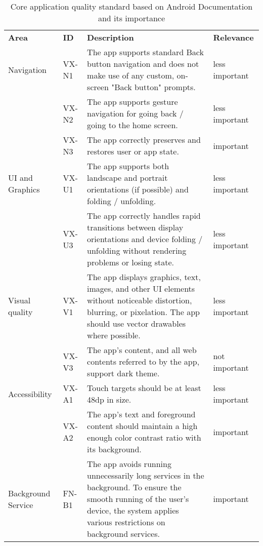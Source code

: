 
\begin{longtable}{p{} p{} p{} p{}}
    \label{tab:qualitystandard}\\

    \caption{Core application quality standard based on Android Documentation \autocite{androidqualityguidelines} and its importance}\\

        \hline
        \textbf{Area} & \textbf{ID} & \textbf{Description} & \textbf{Relevance} \\
        \hline
        Navigation & VX-N1 & The app supports standard Back button navigation and does not make use of any custom, on-screen "Back button" prompts. & less important \\
         & VX-N2 & The app supports gesture navigation for going back / going to the home screen. & less important \\
         & VX-N3 & The app correctly preserves and restores user or app state. & important \\
  
        UI and Graphics & VX-U1 & The app supports both landscape and portrait orientations (if possible) and folding / unfolding. & less important \\
         & VX-U3 & The app correctly handles rapid transitions between display orientations and device folding / unfolding without rendering problems or losing state. & less important \\
  
        Visual quality & VX-V1 & The app displays graphics, text, images, and other UI elements without noticeable distortion, blurring, or pixelation. The app should use vector drawables where possible. & less important \\
         & VX-V3 & The app's content, and all web contents referred to by the app, support dark theme. & not important \\
        
        Accessibility & VX-A1 & Touch targets should be at least 48dp in size. & less important \\
         & VX-A2 & The app's text and foreground content should maintain a high enough color contrast ratio with its background. & important \\
  
        Background Service & FN-B1 & The app avoids running unnecessarily long services in the background. To ensure the smooth running of the user's device, the system applies various restrictions on background services. & important\\


\end{longtable}

